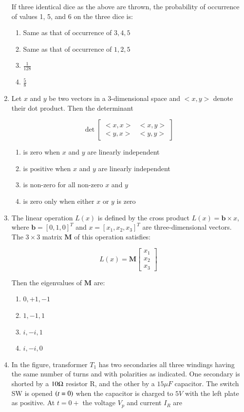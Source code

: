 \documentclass[journal,12pt,onecolumn]{IEEEtran}
\theoremstyle{remark}
\begin{document}
\begin{enumerate}
    If three identical dice as the above are thrown, the probability of occurrence of values 1, 5, and 6 on the three dice is:
    
    \begin{enumerate}
        \item Same as that of occurrence of $3, 4, 5$
        \item Same as that of occurrence of $1, 2, 5$
        \item $\frac{1}{128}$
        \item $\frac{5}{8}$
    \end{enumerate}
        \item Let $x$ and $y$ be two vectors in a 3-dimensional space and $< x, y >$ denote their dot product. Then the determinant

    \[
    \det \begin{bmatrix}
    < x, x > & < x, y > \\
    < y, x > & < y, y >
    \end{bmatrix}
    \]

    \begin{enumerate}
        \item is zero when $x$ and $y$ are linearly independent
        \item is positive when $x$ and $y$ are linearly independent
        \item is non-zero for all non-zero $x$ and $y$
        \item is zero only when either $x$ or $y$ is zero
    \end{enumerate}

    \item The linear operation $L(x)$ is defined by the cross product $L(x) = \mathbf{b} \times x$, where $\mathbf{b} = [0 , 1 , 0]^T$ and $x = [x_1 , x_2 , x_3]^T$ are three-dimensional vectors. The $3 \times 3$ matrix $\mathbf{M}$ of this operation satisfies:

    \[
    L(x) = \mathbf{M} 
    \begin{bmatrix}
    x_1 \\
    x_2 \\
    x_3
    \end{bmatrix}
    \]

    Then the eigenvalues of $\mathbf{M}$ are:

    \begin{enumerate}
        \item $0, +1, -1$
        \item $1, -1, 1$
        \item $i, -i, 1$
        \item $i, -i, 0$
    \end{enumerate}
\item In the figure, transformer $T_1$ has two secondaries all three windings having the same number of turns and with polarities as indicated. One secondary is shorted by a $10 \ohm$ resistor R, and the other by a $15 \mu F$ capacitor. The switch SW is opened $\left(t=0\right)$ when the capacitor is charged to $5V$ with the left plate as positive. At $t=0+$ the voltage $V_p$ and current $I_R$ are


\end{enumerate}
\end{document}
